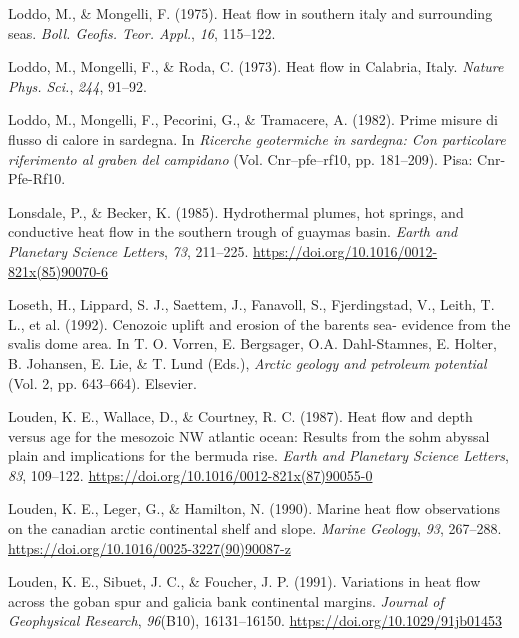 \documentclass[draft,linenumbers]{agujournal2018}
\begin{document}
\leavevmode{}%
Loddo, M., \& Mongelli, F. (1975). Heat flow in southern italy and
surrounding seas. \emph{Boll. Geofis. Teor. Appl.}, \emph{16}, 115--122.

\leavevmode{}%
Loddo, M., Mongelli, F., \& Roda, C. (1973). Heat flow in {Calabria,
Italy}. \emph{Nature Phys. Sci.}, \emph{244}, 91--92.

\leavevmode{}%
Loddo, M., Mongelli, F., Pecorini, G., \& Tramacere, A. (1982). Prime
misure di flusso di calore in sardegna. In \emph{Ricerche geotermiche in
sardegna: Con particolare riferimento al graben del campidano} (Vol.
Cnr--pfe--rf10, pp. 181--209). Pisa: Cnr-Pfe-Rf10.

\leavevmode{}%
Lonsdale, P., \& Becker, K. (1985). Hydrothermal plumes, hot springs,
and conductive heat flow in the southern trough of guaymas basin.
\emph{Earth and Planetary Science Letters}, \emph{73}, 211--225.
\url{https://doi.org/10.1016/0012-821x(85)90070-6}

\leavevmode{}%
Loseth, H., Lippard, S. J., Saettem, J., Fanavoll, S., Fjerdingstad, V.,
Leith, T. L., et al. (1992). Cenozoic uplift and erosion of the barents
sea- evidence from the svalis dome area. In T. O. Vorren, E. Bergsager,
O.A. Dahl-Stamnes, E. Holter, B. Johansen, E. Lie, \& T. Lund (Eds.),
\emph{Arctic geology and petroleum potential} (Vol. 2, pp. 643--664).
Elsevier.

\leavevmode{}%
Louden, K. E., Wallace, D., \& Courtney, R. C. (1987). Heat flow and
depth versus age for the mesozoic NW atlantic ocean: Results from the
sohm abyssal plain and implications for the bermuda rise. \emph{Earth
and Planetary Science Letters}, \emph{83}, 109--122.
\url{https://doi.org/10.1016/0012-821x(87)90055-0}

\leavevmode{}%
Louden, K. E., Leger, G., \& Hamilton, N. (1990). Marine heat flow
observations on the canadian arctic continental shelf and slope.
\emph{Marine Geology}, \emph{93}, 267--288.
\url{https://doi.org/10.1016/0025-3227(90)90087-z}

\leavevmode{}%
Louden, K. E., Sibuet, J. C., \& Foucher, J. P. (1991). Variations in
heat flow across the goban spur and galicia bank continental margins.
\emph{Journal of Geophysical Research}, \emph{96}(B10), 16131--16150.
\url{https://doi.org/10.1029/91jb01453}
\end{document}
